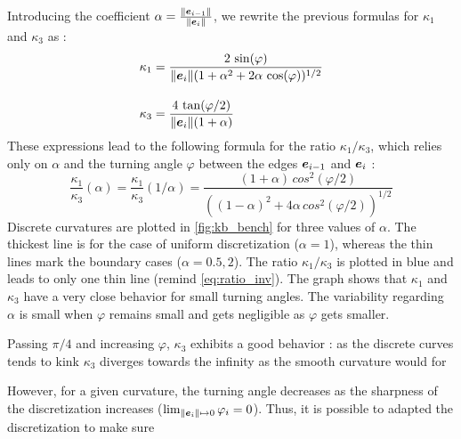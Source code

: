 Introducing the coefficient $\alpha = \frac{\lVert\boldsymbol{e}_{i-1}\rVert}{\lVert\boldsymbol{e}_{i}\rVert}$, we rewrite the previous formulas for $\kappa_1$ and $\kappa_3$ as :
\begin{equation}
\begin{aligned}
	\kappa_1 &= \frac{2 \,\sin(\varphi)}{\lVert\boldsymbol{e}_{i}\rVert(1+ \alpha^2 + 2 \alpha \, \cos(\varphi))^{1/2}} \\[10pt]
	\kappa_3 &= \frac{4 \,\tan(\varphi/2)}{\lVert\boldsymbol{e}_{i}\rVert(1+\alpha)}
\end{aligned}
\end{equation}
These expressions lead to the following formula for the ratio $\kappa_1 / \kappa_3$, which relies only on $\alpha$ and the turning angle $\varphi$ between the edges $\boldsymbol{e}_{i-1}$ and $\boldsymbol{e}_{i}$ :
\begin{equation}
	\frac{\kappa_1}{\kappa_3}(\alpha) = \frac{\kappa_1}{\kappa_3}(1/\alpha)= \frac{(1+\alpha)\,cos^2(\varphi/2)}{((1- \alpha)^2 + 4 \alpha \, cos^2(\varphi/2))^{1/2}}
	\label{eq:ratio_inv}
\end{equation}
Discrete curvatures are plotted in \cref{fig:kb_bench} for three values of $\alpha$. The thickest line is for the case of uniform discretization ($\alpha=1$), whereas the thin lines mark the boundary cases ($\alpha=0.5,2$). The ratio $\kappa_1/\kappa_3$ is plotted in blue and leads to only one thin line (remind \cref{eq:ratio_inv}). The graph shows that $\kappa_1$ and $\kappa_3$ have a very close behavior for small turning angles. The variability regarding $\alpha$ is small when $\varphi$ remains small and gets negligible as $\varphi$ gets smaller.

Passing $\pi/4$ and increasing $\varphi$, $\kappa_3$ exhibits a good behavior : as the discrete curves tends to kink $\kappa_3$ diverges towards the infinity as the smooth curvature would for  




However, for a given curvature, the turning angle decreases as the sharpness of the discretization increases ($\lim_{\lVert\boldsymbol{e}_i\rVert \mapsto 0} \varphi_i = 0$). Thus, it is possible to adapted the discretization to make sure

